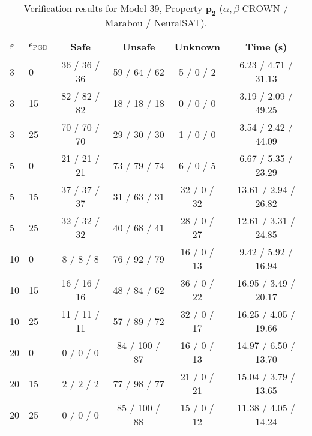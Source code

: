 \begin{table}[htbp]\centering
\caption{\small Verification results for Model 39, Property $\mathbf{p_{2}}$ ($\alpha,\beta$-CROWN / Marabou / NeuralSAT).}
\label{tab:model39_p2}
\begin{tabular}{llcccc}
\toprule
$\varepsilon$ & $\epsilon_{\scriptscriptstyle\mathrm{PGD}}$ & Safe & Unsafe & Unknown & Time (s) \\
\midrule
3 & 0 & 36 / 36 / 36 & 59 / 64 / 62 & 5 / 0 / 2 & 6.23 / 4.71 / 31.13 \\
3 & 15 & 82 / 82 / 82 & 18 / 18 / 18 & 0 / 0 / 0 & 3.19 / 2.09 / 49.25 \\
3 & 25 & 70 / 70 / 70 & 29 / 30 / 30 & 1 / 0 / 0 & 3.54 / 2.42 / 44.09 \\
5 & 0 & 21 / 21 / 21 & 73 / 79 / 74 & 6 / 0 / 5 & 6.67 / 5.35 / 23.29 \\
5 & 15 & 37 / 37 / 37 & 31 / 63 / 31 & 32 / 0 / 32 & 13.61 / 2.94 / 26.82 \\
5 & 25 & 32 / 32 / 32 & 40 / 68 / 41 & 28 / 0 / 27 & 12.61 / 3.31 / 24.85 \\
10 & 0 & 8 / 8 / 8 & 76 / 92 / 79 & 16 / 0 / 13 & 9.42 / 5.92 / 16.94 \\
10 & 15 & 16 / 16 / 16 & 48 / 84 / 62 & 36 / 0 / 22 & 16.95 / 3.49 / 20.17 \\
10 & 25 & 11 / 11 / 11 & 57 / 89 / 72 & 32 / 0 / 17 & 16.25 / 4.05 / 19.66 \\
20 & 0 & 0 / 0 / 0 & 84 / 100 / 87 & 16 / 0 / 13 & 14.97 / 6.50 / 13.70 \\
20 & 15 & 2 / 2 / 2 & 77 / 98 / 77 & 21 / 0 / 21 & 15.04 / 3.79 / 13.65 \\
20 & 25 & 0 / 0 / 0 & 85 / 100 / 88 & 15 / 0 / 12 & 11.38 / 4.05 / 14.24 \\
\bottomrule
\end{tabular}
\end{table}
